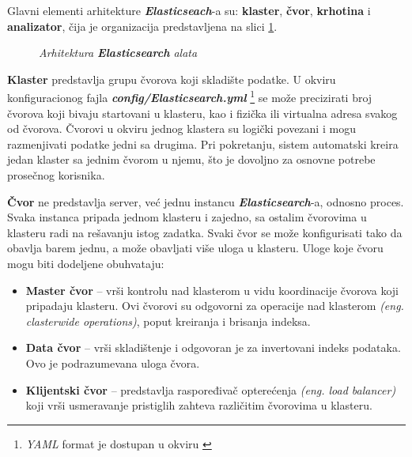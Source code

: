 \par
Glavni elementi arhitekture \textit{\textbf{Elasticseach}}-a su: \textbf{klaster}, \textbf{čvor}, \textbf{krhotina} i \textbf{analizator}, čija je organizacija predstavljena na slici \ref{diagram:ahritektura-elasticsearch-alata}.

\begin{figure}[H]
    \centering
    \columnwidth%
    \fboxrule=1pt%
    \caption{\textit{Arhitektura \textbf{Elasticsearch} alata}}
    \label{diagram:ahritektura-elasticsearch-alata}
\end{figure}

\par
\textbf{Klaster} predstavlja grupu čvorova koji skladište podatke. U okviru konfiguracionog fajla \textit{\textbf{config/Elasticsearch.yml}} \footnote{\textit{YAML} format je dostupan u okviru \cite{YAML}} se može precizirati broj čvorova koji bivaju startovani u klasteru, kao i fizička ili virtualna adresa svakog od čvorova. Čvorovi u okviru jednog klastera su logički povezani i mogu razmenjivati podatke jedni sa drugima. Pri pokretanju, sistem automatski kreira jedan klaster sa jednim čvorom u njemu, što je dovoljno za osnovne potrebe prosečnog korisnika.

\par
\textbf{Čvor} ne predstavlja server, već jednu instancu \textit{\textbf{Elasticsearch}}-a, odnosno proces. Svaka instanca pripada jednom klasteru i zajedno, sa ostalim čvorovima u klasteru radi na rešavanju istog zadatka. Svaki čvor se može konfigurisati tako da obavlja barem jednu, a može obavljati više uloga u klasteru. Uloge koje čvoru mogu biti dodeljene obuhvataju:
\begin{itemize}
\item \textbf{Master čvor} – vrši kontrolu nad klasterom u vidu koordinacije čvorova koji pripadaju klasteru. Ovi čvorovi su odgovorni za operacije nad klasterom \textit{(eng. clasterwide operations)}, poput kreiranja i brisanja indeksa.
\item \textbf{Data čvor} – vrši skladištenje i odgovoran je za invertovani indeks podataka. Ovo je podrazumevana uloga čvora.
\item \textbf{Klijentski čvor} – predstavlja raspoređivač opterećenja \textit{(eng. load balancer)}\cite{Sanders2019-hv} koji vrši usmeravanje pristiglih zahteva različitim čvorovima u klasteru.
\end{itemize}

